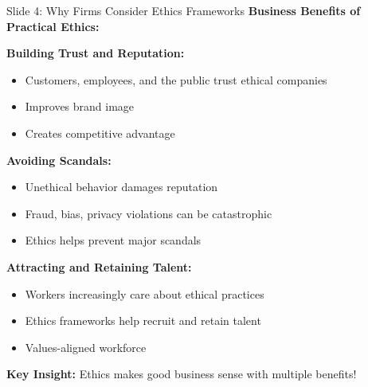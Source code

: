 \documentclass[8pt]{beamer}
\begin{document}
	\begin{frame}{Slide 4: Why Firms Consider Ethics Frameworks}
		\fontsize{6.5}{7.5}\selectfont
		\textbf{Business Benefits of Practical Ethics:}
		
		\vspace{0.1cm}
		\textbf{Building Trust and Reputation:}
		\begin{itemize}
			\item Customers, employees, and the public trust ethical companies
			\item Improves brand image
			\item Creates competitive advantage
		\end{itemize}
		
		\vspace{0.1cm}
		\textbf{Avoiding Scandals:}
		\begin{itemize}
			\item Unethical behavior damages reputation
			\item Fraud, bias, privacy violations can be catastrophic
			\item Ethics helps prevent major scandals
		\end{itemize}
		
		\vspace{0.1cm}
		\textbf{Attracting and Retaining Talent:}
		\begin{itemize}
			\item Workers increasingly care about ethical practices
			\item Ethics frameworks help recruit and retain talent
			\item Values-aligned workforce
		\end{itemize}
		
		\textcolor{myblue}{\textbf{Key Insight:}} Ethics makes \textcolor{myblue}{good business sense} with multiple benefits!
	\end{frame}
	
\end{document}
